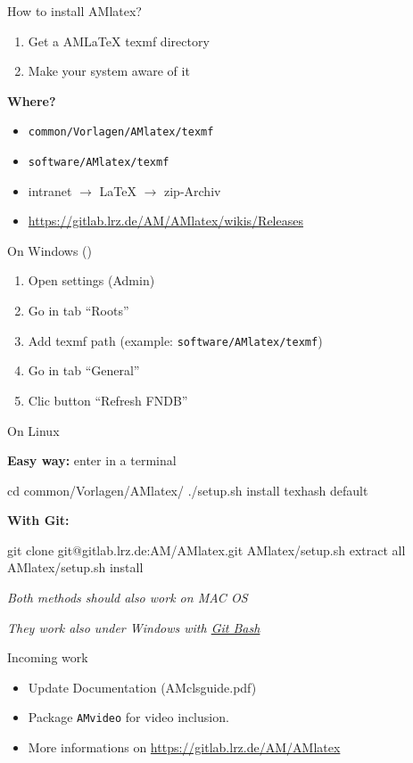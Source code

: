 \documentclass[handout]{AMbeamer}
\begin{document}
\begin{frame}[fragile]{How to install AMlatex?}

\begin{enumerate}
\item Get a AM\LaTeX{} texmf directory
\item Make your system aware of it
\end{enumerate}

\pause

\bigskip
\textbf{Where?}
\begin{itemize}
\item \verb|common/Vorlagen/AMlatex/texmf|
\item \verb|software/AMlatex/texmf|
\item intranet $\to$ LaTeX $\to$ zip-Archiv
\item {\color{red} \url{https://gitlab.lrz.de/AM/AMlatex/wikis/Releases}}
\end{itemize}

\end{frame}


\begin{frame}[fragile]{On Windows ()}

\begin{enumerate}\setlength\itemsep{1.5em}
\item Open  settings (Admin)
\item Go in tab \enquote{Roots}
\item Add texmf path  {\small(example: \verb|software/AMlatex/texmf|)}
\item Go in tab \enquote{General}
\item Clic button \enquote{Refresh FNDB}
\end{enumerate}

\end{frame}


\begin{frame}[fragile]{On Linux}

\textbf{Easy way:} enter in a terminal
\begin{bashshell}
cd common/Vorlagen/AMlatex/
./setup.sh install texhash default
\end{bashshell}

\bigskip
\textbf{With Git:}
\begin{bashshell}
git clone git@gitlab.lrz.de:AM/AMlatex.git
AMlatex/setup.sh extract all
AMlatex/setup.sh install
\end{bashshell}

\vfill
\emph{Both methods should also work on MAC OS}

\emph{They work also under Windows with \color{red}\href{https://git-for-windows.github.io/}{Git Bash}}

\end{frame}


\begin{frame}[fragile]{Incoming work}

\begin{itemize}\renewcommand{\itemsep}{20pt}
\item Update Documentation (AMclsguide.pdf)
\item Package \verb|AMvideo| for video inclusion.
\item More informations on \color{TUMBlue}\url{https://gitlab.lrz.de/AM/AMlatex}
\end{itemize}

\end{frame}
\end{document}
